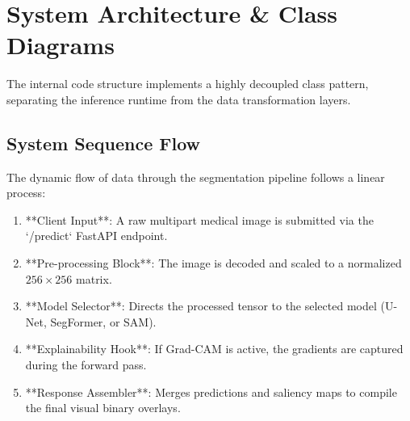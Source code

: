 \documentclass[11pt,journal,onecolumn]{IEEEtran}
\begin{document}
\section{System Architecture \& Class Diagrams}
The internal code structure implements a highly decoupled class pattern, separating the inference runtime from the data transformation layers.

\subsection{System Sequence Flow}
The dynamic flow of data through the segmentation pipeline follows a linear process:
\begin{enumerate}
    \item **Client Input**: A raw multipart medical image is submitted via the `/predict` FastAPI endpoint.
    \item **Pre-processing Block**: The image is decoded and scaled to a normalized $256 \times 256$ matrix.
    \item **Model Selector**: Directs the processed tensor to the selected model (U-Net, SegFormer, or SAM).
    \item **Explainability Hook**: If Grad-CAM is active, the gradients are captured during the forward pass.
    \item **Response Assembler**: Merges predictions and saliency maps to compile the final visual binary overlays.
\end{enumerate}
\end{document}
